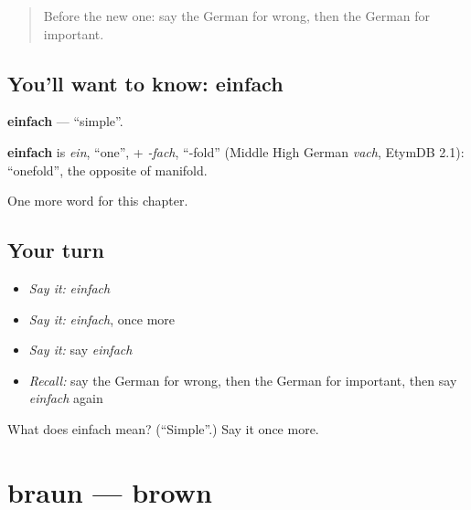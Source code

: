 \label{lesson:GE-C93-einfach}



\begin{quote}
Before the new one: say the German for wrong, then the German for important.
\end{quote}

\subsection*{You'll want to know: einfach}
\textbf{einfach} — \textquotedblleft{}simple\textquotedblright{}.

\begin{cousinweb}
\textbf{einfach} is \emph{ein}, \textquotedblleft{}one\textquotedblright{}, + \emph{-fach}, \textquotedblleft{}-fold\textquotedblright{} (Middle High German \emph{vach}, EtymDB 2.1): \textquotedblleft{}onefold\textquotedblright{}, the opposite of manifold.
\end{cousinweb}

\begin{grammarlens}[title={What you've built}]
One more word for this chapter.
\end{grammarlens}

\subsection*{Your turn}
\begin{itemize}
\raggedright
  \item \emph{Say it:} \emph{einfach}
  \item \emph{Say it:} \emph{einfach}, once more
  \item \emph{Say it:} say \emph{einfach}
  \item \emph{Recall:} say the German for wrong, then the German for important, then say \emph{einfach} again
\end{itemize}

\begin{tcolorbox}[breakable,colback=teal!4,colframe=teal!35!black,title={Before you move on}]
What does einfach mean? (\textquotedblleft{}Simple\textquotedblright{}.) Say it once more.
\end{tcolorbox}
\section[braun]{braun — brown}

\label{lesson:GE-C93-braun}




